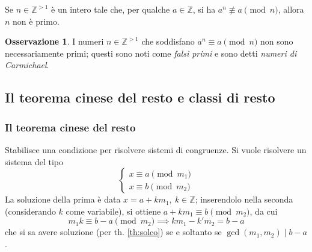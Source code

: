 \documentclass[11pt, a4paper]{scrartcl}
\theoremstyle{definition}
\numberwithin{esempio}{section}
\theoremstyle{definition}
\newtheorem{obs}{Osservazione}
\numberwithin{obs}{section}
\numberwithin{nota}{section}
\numberwithin{equation}{subsection}
\begin{document}
\begin{corollario}
	{}{}
	Se $n \in \mathbb{Z}^{>1} $ \`e un intero tale che, per qualche $a \in \mathbb{Z}$, si ha $a^n \not \equiv a \pmod{n} $, allora $n$ non \`e primo.
\end{corollario}
\begin{obs}
	I numeri $n \in \mathbb{Z}^{>1} $ che soddisfano $a^n \equiv a \pmod{n} $ non sono necessariamente primi; questi sono noti come \textit{falsi primi} e sono detti \textit{numeri di Carmichael}. 
\end{obs}
\subsection{Il teorema cinese del resto e classi di resto}
\subsubsection{Il teorema cinese del resto}

Stabilisce una condizione per risolvere sistemi di congruenze.
Si vuole risolvere un sistema del tipo 
\begin{equation}\label{sisp}
\begin{cases}
	x \equiv a\pmod{m_1}\\
	x \equiv b\pmod{m_2}
\end{cases}
\end{equation} 
La soluzione della prima \`e data $x = a + km_1, \ k \in \mathbb{Z}$; inserendolo nella seconda (considerando $k$ come variabile), si ottiene $a+ km_1 \equiv b \pmod{m_2} $, da cui
\[
m_1 k \equiv b -a \pmod{m_2} \implies k m_1 - k' m_2 = b-a
\] 
che si sa avere soluzione (per th. \ref{th:solco}) se e soltanto se $\operatorname{gcd}(m_1,m_2)  \mid b-a$.
\end{document}
